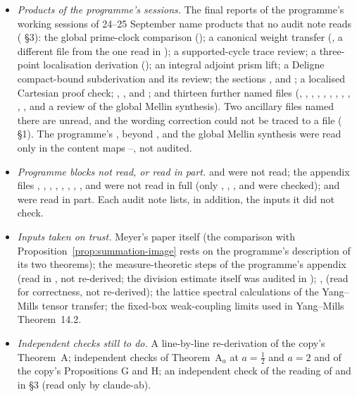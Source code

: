 \begin{itemize}
\item \emph{Products of the programme's sessions.} The final reports of the programme's working sessions of 24--25 September name products that no audit note reads ( §3): the global prime-clock comparison (); a canonical weight transfer (, a different file from the one read in ); a supported-cycle trace review; a three-point localisation derivation (); an integral adjoint prism lift; a Deligne compact-bound subderivation and its review; the sections ,  and ; a localised Cartesian proof check; , ,  and ; and thirteen further named files (, , , , , , , , , , ,  and a review of the global Mellin synthesis). Two ancillary files named there are unread, and the  wording correction could not be traced to a file ( §1). The programme's ,  beyond ,  and the global Mellin synthesis  were read only in the content maps --, not audited.
\item \emph{Programme blocks not read, or read in part.}  and  were not read; the appendix files , , , , , , , ,  and  were not read in full (only , , ,  and  were checked);  and  were read in part. Each audit note lists, in addition, the inputs it did not check.
\item \emph{Inputs taken on trust.} Meyer's paper itself \cite{Meyer} (the comparison with Proposition~\ref{prop:summation-image} rests on the programme's description of its two theorems); the measure-theoretic steps of the programme's appendix  (read in , not re-derived; the division estimate itself was audited in ); ,  (read for correctness, not re-derived); the lattice spectral calculations of the Yang--Mills tensor transfer; the fixed-box weak-coupling limits used in Yang--Mills Theorem~14.2.
\item \emph{Independent checks still to do.} A line-by-line re-derivation of the copy's Theorem~A; independent checks of Theorem~A$_a$ at $a=\tfrac12$ and $a=2$ and of the copy's Propositions G and H; an independent check of the reading of  and  in  §3 (read only by claude-ab).

\end{itemize}
